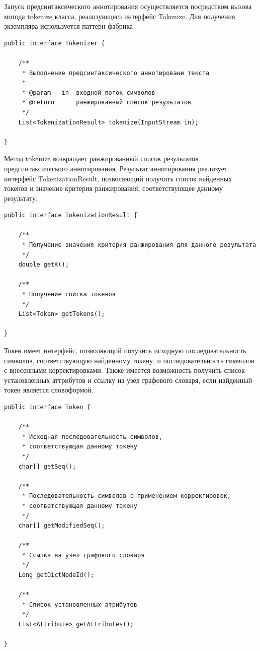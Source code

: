 Запуск предсинтаксического аннотирования осуществляется посредством вызова мотода tokenize класса, реализующего интерфейс Tokenize. Для получения экземпляра используется паттерн фабрика \cite{gof}.
\begin{lstlisting}[caption={Интерфейс модуля предсинтаксического аннотирования}]
public interface Tokenizer {

    /**
     * Выполнение предсинтаксического аннотировани текста
     *
     * @param   in  входной поток символов
     * @return      ранжированный список результатов
     */
    List<TokenizationResult> tokenize(InputStream in);

}
\end{lstlisting}
Метод tokenize возвращает ранжированный список результатов предсинтаксического аннотирования. Результат аннотирования реализует интерфейс TokenizationResult, позволяющий получить список найденных токенов и значение критерия ранжирования, соответствующее данному результату.
\begin{lstlisting}[caption={Интерфейс результата аннотирования}]
public interface TokenizationResult {

    /**
     * Получение значения критерия ранжирования для данного результата
     */
    double getK();

    /**
     * Получение списка токенов
     */
    List<Token> getTokens();

}
\end{lstlisting}
Токен имеет интерфейс, позволяющий получить исходную последовательность символов, соответствующую найденному токену, и последовательность символов с внесенными корректировками. Также имеется возможность получить список установленных аттрибутов и ссылку на узел графового словаря, если найденный токен является словоформой.
\begin{lstlisting}[caption={Интерфейс токена}]
public interface Token {

    /**
     * Исходная последовательность символов,
     * соответствующая данному токену
     */
    char[] getSeq();

    /**
     * Последовательность символов с применением корректировок,
     * соответствующая данному токену
     */
    char[] getModifiedSeq();

    /**
     * Ссылка на узел графового словаря
     */
    Long getDictNodeId();

    /**
     * Список установленных атрибутов
     */
    List<Attribute> getAttributes();

}
\end{lstlisting}